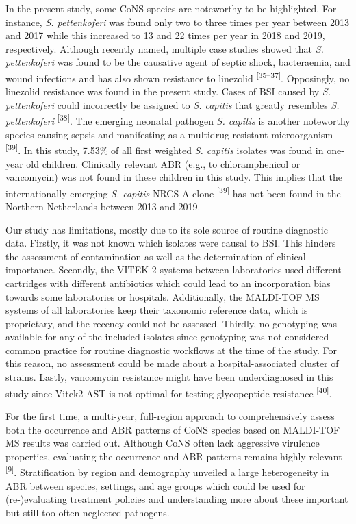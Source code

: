 \documentclass[
]{book}
\begin{document}
In the present study, some CoNS species are noteworthy to be highlighted. For instance, \emph{S. pettenkoferi} was found only two to three times per year between 2013 and 2017 while this increased to 13 and 22 times per year in 2018 and 2019, respectively. Although recently named, multiple case studies showed that \emph{S. pettenkoferi} was found to be the causative agent of septic shock, bacteraemia, and wound infections and has also shown resistance to linezolid \textsuperscript{{[}35--37{]}}. Opposingly, no linezolid resistance was found in the present study. Cases of BSI caused by \emph{S. pettenkoferi} could incorrectly be assigned to \emph{S. capitis} that greatly resembles \emph{S. pettenkoferi} \textsuperscript{{[}38{]}}. The emerging neonatal pathogen \emph{S. capitis} is another noteworthy species causing sepsis and manifesting as a multidrug-resistant microorganism \textsuperscript{{[}39{]}}. In this study, 7.53\% of all first weighted \emph{S. capitis} isolates was found in one-year old children. Clinically relevant ABR (e.g., to chloramphenicol or vancomycin) was not found in these children in this study. This implies that the internationally emerging \emph{S. capitis} NRCS-A clone \textsuperscript{{[}39{]}} has not been found in the Northern Netherlands between 2013 and 2019.

Our study has limitations, mostly due to its sole source of routine diagnostic data. Firstly, it was not known which isolates were causal to BSI. This hinders the assessment of contamination as well as the determination of clinical importance. Secondly, the VITEK 2 systems between laboratories used different cartridges with different antibiotics which could lead to an incorporation bias towards some laboratories or hospitals. Additionally, the MALDI-TOF MS systems of all laboratories keep their taxonomic reference data, which is proprietary, and the recency could not be assessed. Thirdly, no genotyping was available for any of the included isolates since genotyping was not considered common practice for routine diagnostic workflows at the time of the study. For this reason, no assessment could be made about a hospital-associated cluster of strains. Lastly, vancomycin resistance might have been underdiagnosed in this study since Vitek2 AST is not optimal for testing glycopeptide resistance \textsuperscript{{[}40{]}}.

For the first time, a multi-year, full-region approach to comprehensively assess both the occurrence and ABR patterns of CoNS species based on MALDI-TOF MS results was carried out. Although CoNS often lack aggressive virulence properties, evaluating the occurrence and ABR patterns remains highly relevant \textsuperscript{{[}9{]}}. Stratification by region and demography unveiled a large heterogeneity in ABR between species, settings, and age groups which could be used for (re-)evaluating treatment policies and understanding more about these important but still too often neglected pathogens.
\end{document}
